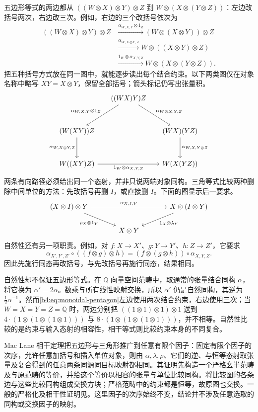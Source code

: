 五边形等式的两边都从 \(((W\otimes X)\otimes Y)\otimes Z\) 到 \(W\otimes(X\otimes(Y\otimes Z))\)：左边改括号两次，右边改三次。例如，右边的三个改括号依次为
\[
	\begin{aligned}
		((W\otimes X)\otimes Y)\otimes Z &\xrightarrow{\alpha_{W,X,Y}\otimes1_Z}(W\otimes(X\otimes Y))\otimes Z\\
		&\xrightarrow{\alpha_{W,X\otimes Y,Z}}W\otimes((X\otimes Y)\otimes Z)\\
		&\xrightarrow{1_W\otimes\alpha_{X,Y,Z}}W\otimes(X\otimes(Y\otimes Z)).
	\end{aligned}
\]
把五种括号方式放在同一图中，就能逐步读出每个结合约束。以下两类图仅在对象名称中略写 \(XY=X\otimes Y\)，保留全部括号；箭头标记仍写出张量积。
\[
	\begin{tikzcd}[column sep=1.5em,row sep=3em]
		&((WX)Y)Z \arrow[dl,"\alpha_{W,X,Y}\otimes1_Z"'] \arrow[dr,"\alpha_{W\otimes X,Y,Z}"]&\\
		(W(XY))Z\arrow[d,"\alpha_{W,X\otimes Y,Z}"']&& (WX)(YZ)\arrow[d,"\alpha_{W,X,Y\otimes Z}"]\\
		W((XY)Z)\arrow[rr,"1_W\otimes\alpha_{X,Y,Z}"']&&W(X(YZ))
	\end{tikzcd}
\]
两条有向路径必须给出同一个态射，并非只说两端对象同构。三角等式比较两种删除中间单位的方法：先改括号再删 \(I\)，或直接删 \(I\)。下面的图显示后一要求。
\[
	\begin{tikzcd}[column sep=large]
		(X\otimes I)\otimes Y \ar[rr,"\alpha_{X,I,Y}"] \ar[dr,"\rho_X\otimes1_Y"'] &&X\otimes(I\otimes Y)\ar[dl,"1_X\otimes\lambda_Y"]\\
		&X\otimes Y&
	\end{tikzcd}
\]
自然性还有另一项职责。例如，对 \(f:X\to X'\)、\(g:Y\to Y'\)、\(h:Z\to Z'\)，它要求
\[
	\alpha_{X',Y',Z'}\circ((f\otimes g)\otimes h) =(f\otimes(g\otimes h))\circ\alpha_{X,Y,Z}.
\]
因此先施行同态再改括号，与先改括号再施行同态，结果相同。

\ProseParagraphBreak
自然性却不保证五边形等式。在 \(\mathbb Q\) 向量空间范畴中，取通常的张量结合同构 \(\alpha\)，将它换为 \(\alpha'=2\alpha\)。数乘与所有线性映射交换，所以 \(\alpha'\) 仍是自然同构，其逆为 \(\tfrac12\alpha^{-1}\)。然而\eqref{b4:eq:monoidal-pentagon}左边使用两次结合约束，右边使用三次；当 \(W=X=Y=Z=\mathbb Q\) 时，两边分别把 \(((1\otimes1)\otimes1)\otimes1\) 送到 \(4\cdot(1\otimes(1\otimes(1\otimes1)))\) 与 \(8\cdot(1\otimes(1\otimes(1\otimes1)))\)，并不相等。自然性比较的是约束与输入态射的相容性，相干等式则比较约束本身的不同复合。

\ProseParagraphBreak
Mac Lane 相干定理把五边形与三角形推广到任意有限个因子：固定有限个因子的次序，允许任意加括号和插入单位对象，则由 \(\alpha,\lambda,\rho\)、它们的逆、与恒等态射取张量及复合得到的任意两条同源同目标映射都相同。其证明先构造一个严格幺半范畴及与原范畴的等价，并给这个等价以相容的张量与单位比较同构。将比较图的各条边与这些比较同构组成交换方块；严格范畴中的约束都是恒等，故原图也交换。一般的严格化及相干性证明见\cite[Theorem 2.8.5, p. 36; Theorem 2.9.2 and Remark 2.9.3, p. 40]{EtingofEtAl2015TensorCategories}。这里因子的次序始终不变，结论并不涉及任意选取的同构或交换因子的映射。

